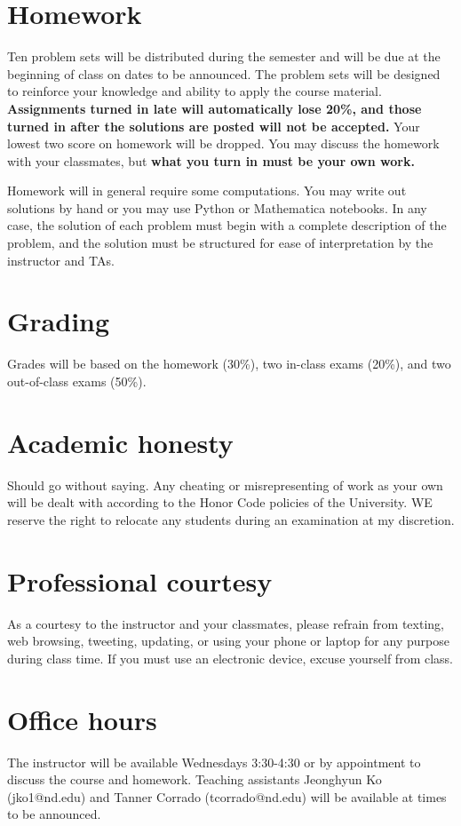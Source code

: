 \documentclass[11pt]{article}
\begin{document}
\section{Homework}
\label{sec:org0fb6270}
Ten problem sets will be distributed during the semester and will be due at the beginning of class on dates to be announced. The problem sets will be designed to reinforce your knowledge and ability to apply the course material.  \textbf{Assignments turned in late will automatically lose 20\%, and those turned in after the solutions are posted will not be accepted.}  Your lowest two score on homework will be dropped.  You may discuss the homework with your classmates, but \textbf{what you turn in must be your own work.}

Homework will in general require some computations. You may write out solutions by hand or you may use Python or Mathematica notebooks. In any case, the solution of each problem must begin with a complete description of the problem, and the solution must be structured for ease of interpretation by the instructor and TAs.

\section{Grading}
\label{sec:org01d4a1d}
Grades will be based on the homework (30\%), two in-class exams (20\%), and two out-of-class exams  (50\%).

\section{Academic honesty}
\label{sec:org200c494}
Should go without saying. Any cheating or misrepresenting of work as your own will be dealt with according to the Honor Code policies of the University. WE reserve the right to relocate any students during an examination at my discretion.

\section{Professional courtesy}
\label{sec:org23b96ab}
As a courtesy to the instructor and your classmates, please refrain from
texting, web browsing, tweeting, updating, or using your phone or laptop for any
purpose during class time.  If you must use an electronic device, excuse
yourself from class.

\section{Office hours}
\label{sec:org088d69b}
The instructor will be available Wednesdays 3:30-4:30 or by appointment to discuss the course and homework.  Teaching assistants Jeonghyun Ko (jko1@nd.edu) and Tanner Corrado (tcorrado@nd.edu) will be available at times to be announced.
\end{document}
